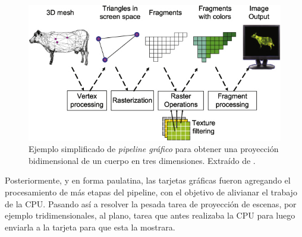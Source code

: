 \begin{figure}
    \centering
    \includegraphics[width=\textwidth]{imagenes/chapter2/pipeline-example.jpg}
    \caption{Ejemplo simplificado de \textit{pipeline gráfico} para obtener una proyección bidimensional de un cuerpo en tres dimensiones. Extraído de \cite{pipeline-example}.}
    \label{fig:pipeline-example}
\end{figure}
Posteriormente, y en forma paulatina, las tarjetas gráficas fueron agregando el procesamiento de más etapas del pipeline, con el objetivo de alivianar el trabajo de la  CPU. Pasando así a resolver la pesada tarea de proyección de escenas, por ejemplo tridimensionales, al plano, tarea que antes realizaba la CPU para luego enviarla a la tarjeta para que esta la mostrara.

